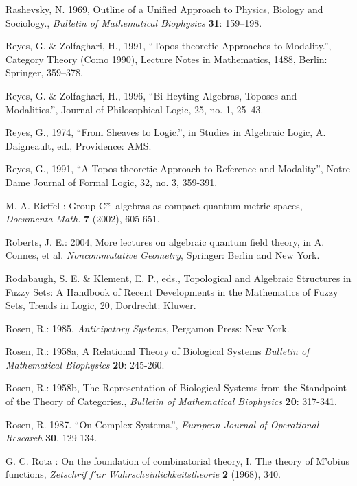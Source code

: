 \documentclass[12pt]{article}
\begin{document}
\begin{thebibliography}{399}
Rashevsky, N. 1969, Outline of a Unified Approach to Physics, Biology and Sociology., \emph{Bulletin of Mathematical Biophysics} \textbf{31}: 159--198.

Reyes, G. \& Zolfaghari, H., 1991, ``Topos-theoretic Approaches to Modality.'', Category Theory (Como 1990), Lecture Notes in Mathematics, 1488, Berlin: Springer, 359--378. 

Reyes, G. \& Zolfaghari, H., 1996, ``Bi-Heyting Algebras, Toposes and Modalities.'', Journal of Philosophical Logic, 25, no. 1, 25--43. 

Reyes, G., 1974, ``From Sheaves to Logic.'', in Studies in Algebraic Logic, A. Daigneault, ed., Providence: AMS. 

Reyes, G., 1991, ``A Topos-theoretic Approach to Reference and Modality'', Notre Dame Journal of Formal Logic, 32, no. 3, 359-391.

M. A. Rieffel : Group C*--algebras as compact quantum metric spaces, \emph{Documenta Math.} \textbf{7} (2002), 605-651.

Roberts, J. E.: 2004, More lectures on algebraic quantum field theory, in A. Connes, et al. \emph{Noncommutative Geometry}, Springer: Berlin and New York.

Rodabaugh, S. E. \& Klement, E. P., eds., Topological and Algebraic Structures in Fuzzy Sets: A Handbook of Recent Developments in the Mathematics of Fuzzy Sets, Trends in Logic, 20, Dordrecht: Kluwer. 

Rosen, R.: 1985, \emph{Anticipatory Systems}, Pergamon Press: New York.

Rosen, R.: 1958a, A Relational Theory of Biological Systems \emph{Bulletin of Mathematical Biophysics} \textbf{20}: 245-260.

Rosen, R.: 1958b, The Representation of Biological Systems from the Standpoint of the Theory of Categories., \emph{ Bulletin of Mathematical Biophysics} \textbf{20}: 317-341.

Rosen, R. 1987. ``On Complex Systems.'', \emph{European Journal of Operational Research} \textbf{30}, 129-134.

 G. C. Rota : On the foundation of combinatorial theory,
I. The theory of M\''obius functions, \emph{Zetschrif f\''ur
Wahrscheinlichkeitstheorie} \textbf{2} (1968), 340.


\end{thebibliography}
\end{document}
